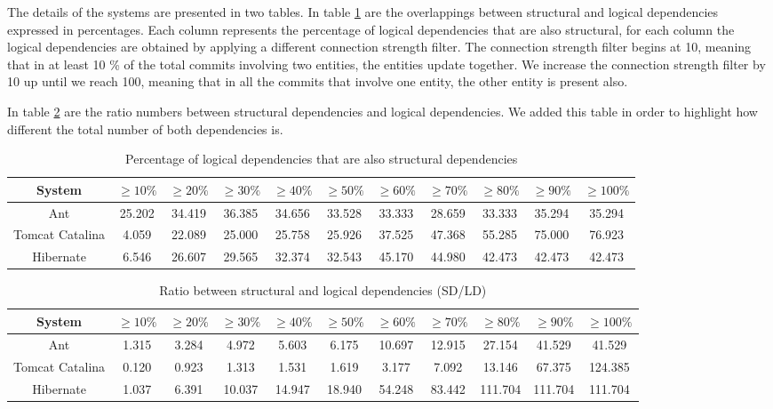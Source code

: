 \documentclass[runningheads]{comsis2}
\begin{document}
The details of the systems are presented in two tables.  In table \ref{tab:overlap} are the overlappings between structural and logical dependencies expressed in percentages. Each column represents the percentage of logical dependencies that are also structural, for each column the logical dependencies are obtained by applying a different connection strength filter. The connection strength filter begins at 10, meaning that in at least 10 \% of the total commits involving two entities, the entities update together. We increase the connection strength filter by 10 up until we reach 100, meaning that in all the commits that involve one entity, the other entity is present also.


In table \ref{tab:ratio_sd_ld} are the ratio numbers between structural dependencies and logical dependencies. We added this table in order to highlight how different the total number of both dependencies is.


\begin{table}[!h]
\renewcommand{\arraystretch}{1}
\caption{Percentage of logical dependencies that are also structural dependencies}
\label{tab:overlap}
\centering
\begin{tabular}{|c|cccccccccc|}
\hline
System &	$\geq10\%$	&	$\geq20\%$		&	$\geq30\%$		&	$\geq40\%$		&	$\geq50\%$		&	$\geq60\%$		&	$\geq70\%$		&	$\geq80\%$		&	$\geq90\%$		&	$\geq100\%$ \\
\hline
Ant	&	25.202	&	34.419	&	36.385	&	34.656	&	33.528	&	33.333	&	28.659	&	33.333	&	35.294	&	35.294	\\
Tomcat Catalina	&	4.059	&	22.089	&	25.000	&	25.758	&	25.926	&	37.525	&	47.368	&	55.285	&	75.000	&	76.923	\\
Hibernate	&	6.546	&	26.607	&	29.565	&	32.374	&	32.543	&	45.170	&	44.980	&	42.473	&	42.473	&	42.473	\\
\hline
\end{tabular}
\end{table}



\begin{table}[!h]
\renewcommand{\arraystretch}{1}
\caption{Ratio between structural and logical dependencies (SD/LD)}
\label{tab:ratio_sd_ld}
\centering
\begin{tabular}{|c|cccccccccc|}
\hline
System &	$\geq10\%$	&	$\geq20\%$		&	$\geq30\%$		&	$\geq40\%$		&	$\geq50\%$		&	$\geq60\%$		&	$\geq70\%$		&	$\geq80\%$		&	$\geq90\%$		&	$\geq100\%$ \\
\hline
Ant	&	1.315	&	3.284	&	4.972	&	5.603	&	6.175	&	10.697	&	12.915	&	27.154	&	41.529	&	41.529	\\
Tomcat Catalina	&	0.120	&	0.923	&	1.313	&	1.531	&	1.619	&	3.177	&	7.092	&	13.146	&	67.375	&	124.385	\\
Hibernate	&	1.037	&	6.391	&	10.037	&	14.947	&	18.940	&	54.248	&	83.442	&	111.704	&	111.704	&	111.704	\\

\hline
\end{tabular}
\end{table}
\end{document}
